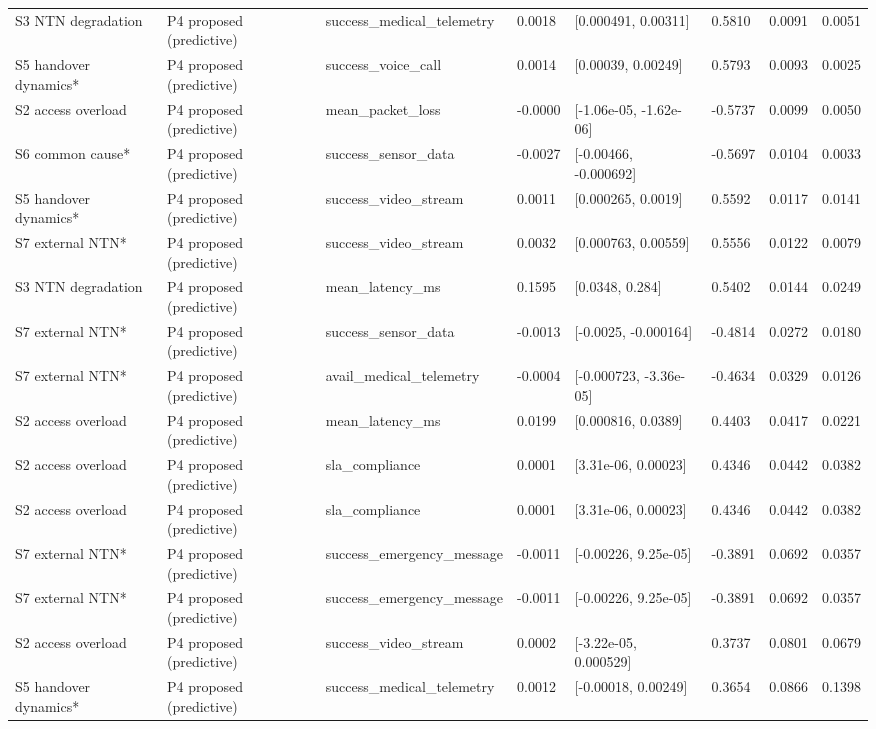 \begin{tabular}{llllllll}
S3 NTN degradation & P4 proposed (predictive) & success\_medical\_telemetry & 0.0018 & [0.000491, 0.00311] & 0.5810 & 0.0091 & 0.0051 \\
S5 handover dynamics* & P4 proposed (predictive) & success\_voice\_call & 0.0014 & [0.00039, 0.00249] & 0.5793 & 0.0093 & 0.0025 \\
S2 access overload & P4 proposed (predictive) & mean\_packet\_loss & -0.0000 & [-1.06e-05, -1.62e-06] & -0.5737 & 0.0099 & 0.0050 \\
S6 common cause* & P4 proposed (predictive) & success\_sensor\_data & -0.0027 & [-0.00466, -0.000692] & -0.5697 & 0.0104 & 0.0033 \\
S5 handover dynamics* & P4 proposed (predictive) & success\_video\_stream & 0.0011 & [0.000265, 0.0019] & 0.5592 & 0.0117 & 0.0141 \\
S7 external NTN* & P4 proposed (predictive) & success\_video\_stream & 0.0032 & [0.000763, 0.00559] & 0.5556 & 0.0122 & 0.0079 \\
S3 NTN degradation & P4 proposed (predictive) & mean\_latency\_ms & 0.1595 & [0.0348, 0.284] & 0.5402 & 0.0144 & 0.0249 \\
S7 external NTN* & P4 proposed (predictive) & success\_sensor\_data & -0.0013 & [-0.0025, -0.000164] & -0.4814 & 0.0272 & 0.0180 \\
S7 external NTN* & P4 proposed (predictive) & avail\_medical\_telemetry & -0.0004 & [-0.000723, -3.36e-05] & -0.4634 & 0.0329 & 0.0126 \\
S2 access overload & P4 proposed (predictive) & mean\_latency\_ms & 0.0199 & [0.000816, 0.0389] & 0.4403 & 0.0417 & 0.0221 \\
S2 access overload & P4 proposed (predictive) & sla\_compliance & 0.0001 & [3.31e-06, 0.00023] & 0.4346 & 0.0442 & 0.0382 \\
S2 access overload & P4 proposed (predictive) & sla\_compliance & 0.0001 & [3.31e-06, 0.00023] & 0.4346 & 0.0442 & 0.0382 \\
S7 external NTN* & P4 proposed (predictive) & success\_emergency\_message & -0.0011 & [-0.00226, 9.25e-05] & -0.3891 & 0.0692 & 0.0357 \\
S7 external NTN* & P4 proposed (predictive) & success\_emergency\_message & -0.0011 & [-0.00226, 9.25e-05] & -0.3891 & 0.0692 & 0.0357 \\
S2 access overload & P4 proposed (predictive) & success\_video\_stream & 0.0002 & [-3.22e-05, 0.000529] & 0.3737 & 0.0801 & 0.0679 \\
S5 handover dynamics* & P4 proposed (predictive) & success\_medical\_telemetry & 0.0012 & [-0.00018, 0.00249] & 0.3654 & 0.0866 & 0.1398 \\

\end{tabular}
